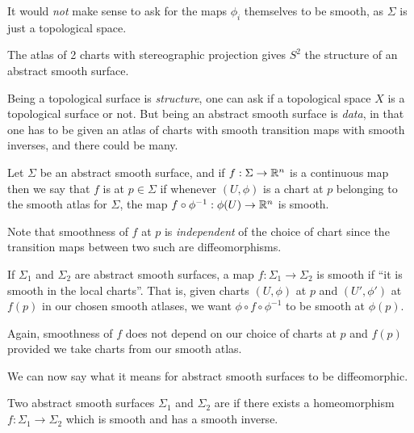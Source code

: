 \documentclass[a4paper]{scrartcl}
\begin{document}
\begin{remark}
    It would \emph{not} make sense to ask for the maps $\phi_i$ themselves to be smooth, as $\Sigma$ is just a topological space.
\end{remark}

\begin{example}
    The atlas of 2 charts with stereographic projection gives $S^2$ the structure of an abstract smooth surface.
\end{example}

\begin{remark}[Philosophical]
    Being a topological surface is \emph{structure}, one can ask if a topological space $X$ is a topological surface or not. But being an abstract smooth surface is \emph{data}, in that one has to be given an atlas of charts with smooth transition maps with smooth inverses, and there could be many.
\end{remark}

\begin{definition}
    Let $\Sigma$ be an abstract smooth surface, and if $f: \Sigma \rightarrow \mathbb{R}^n$ is a continuous map then we say that $f$ is  at $p \in \Sigma$ if whenever $(U, \phi)$ is a chart at $p$ belonging to the smooth atlas for $\Sigma$, the map $f \circ \phi^{-1}: \phi(U) \rightarrow \mathbb{R}^n$ is smooth.
\end{definition}

Note that smoothness of $f$ at $p$ is \emph{independent} of the choice of chart since the transition maps between two such are diffeomorphisms.

\begin{definition}
    If $\Sigma_1$ and $\Sigma_2$ are abstract smooth surfaces, a map $f: \Sigma_1 \rightarrow \Sigma_2$ is smooth if ``it is smooth in the local charts''. That is, given charts $(U, \phi)$ at $p$ and $(U', \phi')$ at $f(p)$ in our chosen smooth atlases, we want $\phi 
    \circ f \circ \phi^{-1}$ to be smooth at $\phi(p)$.
\end{definition}

Again, smoothness of $f$ does not depend on our choice of charts at $p$ and $f(p)$ provided we take charts from our smooth atlas.

We can now say what it means for abstract smooth surfaces to be diffeomorphic.

\begin{definition}[Diffeomorphic]
    Two abstract smooth surfaces $\Sigma_1$ and $\Sigma_2$ are  if there exists a homeomorphism $f: \Sigma_1 \rightarrow \Sigma_2$ which is smooth and has a smooth inverse.
\end{definition}
\end{document}
